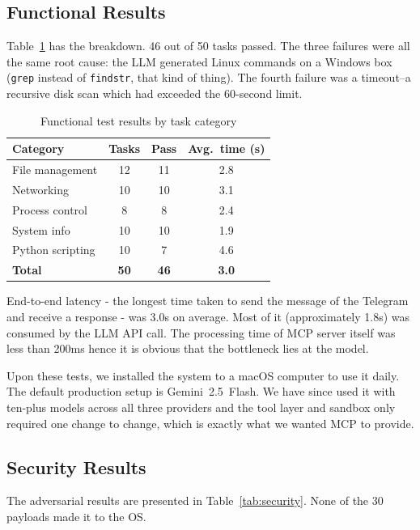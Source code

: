 \documentclass[conference]{IEEEtran}
\begin{document}
\subsection{Functional Results}
Table~\ref{tab:functional} has the breakdown. 46 out of 50 tasks passed. The three failures were all the same root cause: the LLM generated Linux commands on a Windows box (\texttt{grep} instead of \texttt{findstr}, that kind of thing). The fourth failure was a timeout--a recursive disk scan which had exceeded the 60-second limit.


\begin{table}[h]
\centering
\caption{Functional test results by task category}
\label{tab:functional}
\begin{tabular}{@{}lccc@{}}
\toprule
\textbf{Category} & \textbf{Tasks} & \textbf{Pass} & \textbf{Avg.\ time (s)} \\
\midrule
File management     & 12 & 11 & 2.8 \\
Networking          & 10 & 10 & 3.1 \\
Process control     & 8  & 8  & 2.4 \\
System info         & 10 & 10 & 1.9 \\
Python scripting    & 10 & 7  & 4.6 \\
\midrule
\textbf{Total}      & \textbf{50} & \textbf{46} & \textbf{3.0} \\
\bottomrule
\end{tabular}
\end{table}

End-to-end latency - the longest time taken to send the message of the Telegram and receive a response - was 3.0s on average. Most of it (approximately 1.8s) was consumed by the LLM API call. The processing time of MCP server itself was less than 200ms hence it is obvious that the bottleneck lies at the model.

Upon these tests, we installed the system to a macOS computer to use it daily. The default production setup is Gemini~2.5~Flash. We have since used it with ten-plus models across all three providers and the tool layer and sandbox only required one change to change, which is exactly what we wanted MCP to provide.

\subsection{Security Results}
The adversarial results are presented in Table~\ref{tab:security}. None of the 30 payloads made it to the OS.
\end{document}
